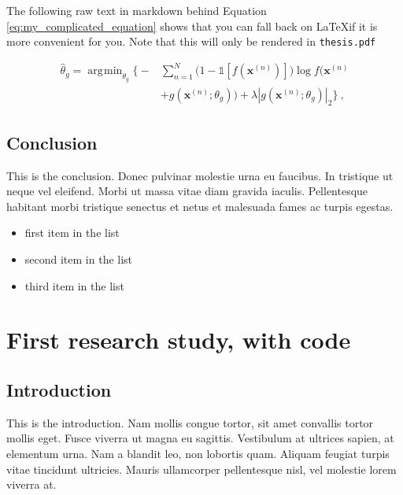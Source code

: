 \documentclass[12pt,a4paper,]{report}
\providecommand{\tightlist}{%
  \setlength{\itemsep}{0pt}\setlength{\parskip}{0pt}}
\DeclareMathOperator*{\argmin}{\arg\!\min}
\begin{document}
The following raw text in markdown behind Equation
\ref{eq:my_complicated_equation} shows that you can fall back on
\LaTeX if it is more convenient for you. Note that this will only be
rendered in \texttt{thesis.pdf}

\begin{equation}
\begin{aligned}
    \hat{\theta}_g = \argmin_{\theta_g} \Big\{ - &\sum^{N}_{n=1}\Big( 1-\mathbb{1}[f(\pmb x^{(n)})]\Big)\log f\Big(\pmb x^{(n)} \\ 
    &+ g(\pmb x^{(n)};\theta_g)\Big) + \lambda|g(\pmb x^{(n)};\theta_g)|_2 \Big\} \ ,
\end{aligned}
\label{eq:my_complicated_equation}\end{equation}

\hypertarget{conclusion}{%
\section{Conclusion}\label{conclusion}}

This is the conclusion. Donec pulvinar molestie urna eu faucibus. In
tristique ut neque vel eleifend. Morbi ut massa vitae diam gravida
iaculis. Pellentesque habitant morbi tristique senectus et netus et
malesuada fames ac turpis egestas.

\begin{itemize}
\tightlist
\item
  first item in the list
\item
  second item in the list
\item
  third item in the list
\end{itemize}

\hypertarget{first-research-study-with-code}{%
\chapter{First research study, with
code}\label{first-research-study-with-code}}

\hypertarget{introduction-1}{%
\section{Introduction}\label{introduction-1}}

This is the introduction. Nam mollis congue tortor, sit amet convallis
tortor mollis eget. Fusce viverra ut magna eu sagittis. Vestibulum at
ultrices sapien, at elementum urna. Nam a blandit leo, non lobortis
quam. Aliquam feugiat turpis vitae tincidunt ultricies. Mauris
ullamcorper pellentesque nisl, vel molestie lorem viverra at.
\end{document}
